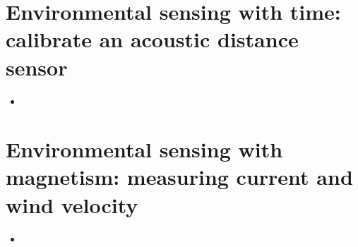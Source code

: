 

%
%
%




%


%








\vspace{4cm}



\section[\color{gray} Environmental sensing with time \color{black}]{Environmental sensing with time: calibrate an acoustic distance sensor}
\begin{itemize}
	\item
\end{itemize}

\section{\color{gray} Environmental sensing with magnetism: measuring current and wind velocity \color{black}}
\begin{itemize}
	\item
\end{itemize}






